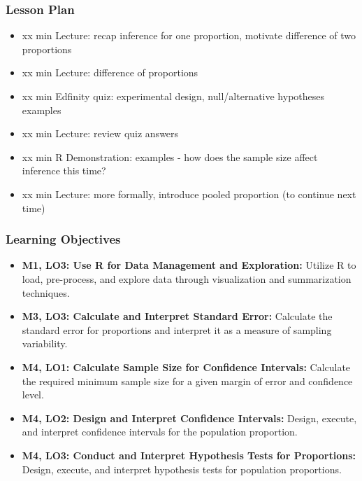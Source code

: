 \begin{frame}
    \frametitle{Lesson Plan}
    \begin{itemize}
        \item xx min Lecture: recap inference for one proportion, motivate difference of two proportions
        \item xx min Lecture: difference of proportions
        \item xx min Edfinity quiz: experimental design, null/alternative hypotheses examples
        \item xx min Lecture: review quiz answers
        \item xx min R Demonstration: examples - how does the sample size affect inference this time?
        \item xx min Lecture: more formally, introduce pooled proportion (to continue next time)
    \end{itemize}
\end{frame}
            
\begin{frame}
    \frametitle{Learning Objectives}
    \begin{itemize}
        \item \textbf{M1, LO3: Use R for Data Management and Exploration:} Utilize R to load, pre-process, and explore data through visualization and summarization techniques.
        \item \textbf{M3, LO3: Calculate and Interpret Standard Error:} Calculate the standard error for proportions and interpret it as a measure of sampling variability.
        \item \textbf{M4, LO1: Calculate Sample Size for Confidence Intervals:} Calculate the required minimum sample size for a given margin of error and confidence level.
        \item \textbf{M4, LO2: Design and Interpret Confidence Intervals:} Design, execute, and interpret confidence intervals for the population proportion.
        \item \textbf{M4, LO3: Conduct and Interpret Hypothesis Tests for Proportions:} Design, execute, and interpret hypothesis tests for population proportions.
    \end{itemize}
\end{frame}
    
